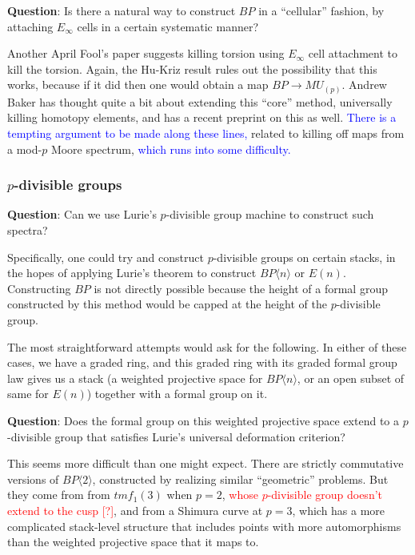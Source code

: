 \documentclass[12pt,titlepage]{article}
\newcommand{\rd}[1]{{\textcolor{red}{#1}}}
\newcommand{\bl}[1]{{\textcolor{blue}{#1}}}
\theoremstyle{plain}
\theoremstyle{definition}
\theoremstyle{remark}
\begin{document}
\textbf{Question}: Is there a natural way to construct $BP$ in a ``{}cellular''{} fashion, by attaching $E_\infty$ cells in a certain systematic manner?

Another April Fool'{}s paper suggests killing torsion using $E_\infty$ cell attachment to kill the torsion. Again, the Hu-Kriz result rules out the possibility that this works, because if it did then one would obtain a map $BP \to MU_{(p)}$. Andrew Baker has thought quite a bit about extending this ``{}core''{} method, universally killing homotopy elements, and has a recent preprint on this as well. \bl{There is a tempting argument to be made along these lines,} related to killing off maps from a mod-$p$ Moore spectrum, \bl{which runs into some difficulty.}

\hypertarget{divisible_groups_12}{}\subsubsection{{$p$-divisible groups}}\label{divisible_groups_12}

\textbf{Question}: Can we use Lurie'{}s $p$-divisible group machine to construct such spectra?

Specifically, one could try and construct $p$-divisible groups on certain stacks, in the hopes of applying Lurie'{}s theorem to construct $BP\langle n\rangle$ or $E(n)$. Constructing $BP$ is not directly possible because the height of a formal group constructed by this method would be capped at the height of the $p$-divisible group.

The most straightforward attempts would ask for the following. In either of these cases, we have a graded ring, and this graded ring with its graded formal group law gives us a stack (a weighted projective space for $BP\langle n\rangle$, or an open subset of same for $E(n)$) together with a formal group on it.

\textbf{Question}: Does the formal group on this weighted projective space extend to a $p$-divisible group that satisfies Lurie'{}s universal deformation criterion?

This seems more difficult than one might expect. There are strictly commutative versions of $BP\langle 2\rangle$, constructed by realizing similar ``{}geometric''{} problems. But they come from from $tmf_1(3)$ when $p=2$, \rd{whose $p$-divisible group doesn'{}t extend to the cusp [?]}, and from a Shimura curve at $p=3$, which has a more complicated stack-level structure that includes points with more automorphisms than the weighted projective space that it maps to.
\end{document}
